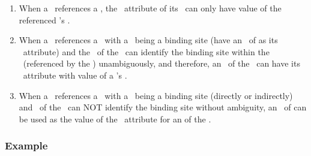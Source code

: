 \begin{enumerate}[label=(\arabic*)]
 \item When a \species\ references \mBlockChangedBegin{\revTwentyTwentyMarch}a\mBlockChangedEnd{\revTwentyTwentyMarch} \bindingSiteSpeciesType, \mBlockChangedBegin{\revTwentyTwentyMarch}the \componentAtt\ attribute of its \outwardBindingSite\ can only have value of the referenced \speciesType 's \idAtt.\mBlockChangedEnd{\revTwentyTwentyMarch}
 \item When a \species\ references a \speciesType\ with a \speciesTypeInstance\ being a binding site (have an \idAtt\ of \BindingSiteSpeciesType as its \speciesTypeAtt\ attribute) and the \idAtt\ of the \speciesTypeInstance\ can
identify the binding site within the \speciesType\ (referenced by the \species) unambiguously, and therefore, \mBlockChangedBegin{\revTwentyTwentyMarch}an \outwardBindingSite\ of the \species\ can have its \componentAtt\ attribute with value of a \speciesTypeInstance 's \idAtt\mBlockChangedEnd{\revTwentyTwentyMarch}.
  \item When a \species\ references a \speciesType\ with a \speciesTypeInstance\ being a binding site (directly or indirectly) and \idAtt\ of the \speciesTypeInstance\ can NOT identify the binding site without ambiguity, an \idAtt\  of \SpeciesTypeComponentIndex can be used as the value of the \componentAtt\ attribute \mBlockChangedBegin{\revTwentyTwentyMarch}for\mBlockChangedEnd{\revTwentyTwentyMarch} an  of the \species.
\end{enumerate}

\subsubsection{Example}


